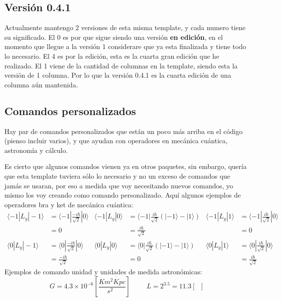 \documentclass[11pt,letterpaper]{article}
\DeclareMathOperator{\lsol}{L_\odot}               %
\DeclareMathOperator{\msol}{M_\odot}               %
\newcommand{\units}[1]{\left[ #1 \right]}          %
\newcommand{\bra}[1]{\langle #1 |}                 %
\newcommand{\ket}[1]{| #1 \rangle}                 %
\begin{document}
\subsection*{Versión 0.4.1}
Actualmente mantengo 2 versiones de esta misma template, y cada numero tiene su significado. El 0 es por que sigue siendo una versión \textbf{en edición}, en el momento que llegue a la versión 1 considerare que ya esta finalizada y tiene todo lo necesario. El 4 es por la edición, esta es la cuarta gran edición que he realizado. El 1 viene de la cantidad de columnas en la template, siendo esta la versión de 1 columna. Por lo que la versión 0.4.1 es la cuarta edición de una columna aún mantenida.
\subsection*{Comandos personalizados}

Hay par de comandos personalizados que están un poco más arriba en el código (pienso incluir varios), y que ayudan con operadores en mecánica cuántica, astronomía y cálculo.\par

Es cierto que algunos comandos vienen ya en otros paquetes, sin embargo, quería que esta template tuviera sólo lo necesario y no un exceso de comandos que jamás se usaran, por eso a medida que voy necesitando nuevos comandos, yo mismo los voy creando como comando personalizado. Aquí algunos ejemplos de operadores bra y ket de mecánica cuántica:
\begin{align*}
    \bra{-1}L_y\ket{-1} &= \bra{-1}\frac{-i\hbar}{\sqrt{2}}\ket{0} & \bra{-1}L_y\ket{0} &= \bra{-1}\frac{i\hbar}{\sqrt{2}}(\ket{-1} - \ket{1}) & \bra{-1}L_y\ket{1} &= \bra{-1}\frac{i\hbar}{\sqrt{2}}\ket{0}\\
     &= 0 & &= \frac{i\hbar}{\sqrt{2}} & &= 0\\
    \bra{0}L_y\ket{-1} &= \bra{0}\frac{-i\hbar}{\sqrt{2}}\ket{0} & \bra{0}L_y\ket{0} &= \bra{0}\frac{i\hbar}{\sqrt{2}}(\ket{-1} - \ket{1}) & \bra{0}L_y\ket{1} &= \bra{0}\frac{i\hbar}{\sqrt{2}}\ket{0}\\
     &= \frac{-i\hbar}{\sqrt{2}} & &= 0 & &= \frac{i\hbar}{\sqrt{2}}
\end{align*}
Ejemplos de comando unidad y unidades de medida astronómicas:
\begin{equation*}
    G = 4.3\times10^{-6}\units{\frac{Km^2Kpc}{s^2\msol}} \hspace{1cm} L = 2^{3.5} = 11.3 \units{\lsol}
\end{equation*}
\end{document}
